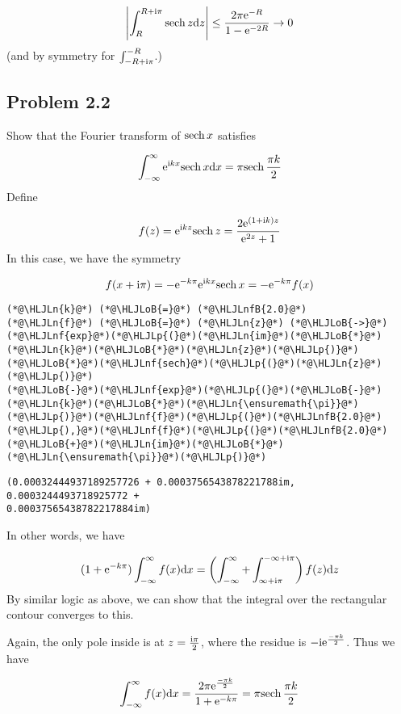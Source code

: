 \documentclass[12pt,landscape]{article}
\newcommand{\HLJLn}[1]{#1}
\newcommand{\HLJLnf}[1]{\textcolor[RGB]{66,102,213}{#1}}
\newcommand{\HLJLnfB}[1]{\textcolor[RGB]{59,151,46}{#1}}
\newcommand{\HLJLoB}[1]{\textcolor[RGB]{102,102,102}{\textbf{#1}}}
\newcommand{\HLJLp}[1]{#1}
\def\D{ {\rm d} }
\def\I{ {\rm i} }
\def\E{ {\rm e} }
\def\sech{ {\rm sech}\, }
\def\dx{\D x}
\def\dz{\D z}
\begin{document}
{\[
 \left|\int_R^{R+\I \pi} \sech z \dz \right| \leq {2 \pi \E^{-R} \over 1 - \E^{-2R}} \rightarrow 0
\]
(and by symmetry for $\int_{-R+\I \pi}^{-R}$.)
\newpage
\subsection{Problem 2.2}
Show that the Fourier transform of $\sech x$ satisfies

\[
\int_{-\infty}^\infty \E^{\I k x } \sech x \dx = \pi \sech {\pi k \over 2}
\]
Define

\[
f(z) = \E^{\I k z } \sech z = {2 \E^{(1+\I k) z} \over \E^{2 z } + 1}
\]
In this case, we have the symmetry

\[
f(x + \I \pi) = - \E^{- k \pi} \E^{\I k x} \sech x = - \E^{-k \pi} f(x)
\]

\begin{lstlisting}
(*@\HLJLn{k}@*) (*@\HLJLoB{=}@*) (*@\HLJLnfB{2.0}@*)
(*@\HLJLn{f}@*) (*@\HLJLoB{=}@*) (*@\HLJLn{z}@*) (*@\HLJLoB{->}@*) (*@\HLJLnf{exp}@*)(*@\HLJLp{(}@*)(*@\HLJLn{im}@*)(*@\HLJLoB{*}@*)(*@\HLJLn{k}@*)(*@\HLJLoB{*}@*)(*@\HLJLn{z}@*)(*@\HLJLp{)}@*)(*@\HLJLoB{*}@*)(*@\HLJLnf{sech}@*)(*@\HLJLp{(}@*)(*@\HLJLn{z}@*)(*@\HLJLp{)}@*)
(*@\HLJLoB{-}@*)(*@\HLJLnf{exp}@*)(*@\HLJLp{(}@*)(*@\HLJLoB{-}@*)(*@\HLJLn{k}@*)(*@\HLJLoB{*}@*)(*@\HLJLn{\ensuremath{\pi}}@*)(*@\HLJLp{)}@*)(*@\HLJLnf{f}@*)(*@\HLJLp{(}@*)(*@\HLJLnfB{2.0}@*)(*@\HLJLp{),}@*)(*@\HLJLnf{f}@*)(*@\HLJLp{(}@*)(*@\HLJLnfB{2.0}@*)(*@\HLJLoB{+}@*)(*@\HLJLn{im}@*)(*@\HLJLoB{*}@*)(*@\HLJLn{\ensuremath{\pi}}@*)(*@\HLJLp{)}@*)
\end{lstlisting}

\begin{lstlisting}
(0.00032444937189257726 + 0.0003756543878221788im, 0.0003244493718925772 + 
0.00037565438782217884im)
\end{lstlisting}


In other words, we have

\[
(1 + \E^{-k \pi}) \int_{-\infty}^\infty f(x) \dx =\left(\int_{-\infty}^\infty +  \int_{\infty+\I \pi}^{-\infty + \I \pi}\right) f(z) \dz
\]
By similar logic as above, we can show that the integral over the rectangular contour converges to this.

Again, the only pole inside is at $z = {\I \pi \over 2}$, where the residue is $-\I \E^{-\pi k \over 2}$. Thus we have

\[
\int_{-\infty}^\infty f(x) \dx = {2 \pi \E^{-\pi k \over 2} \over 1 + \E^{-k \pi}} = \pi \sech{\pi k \over 2}
\]

}
\end{document}
